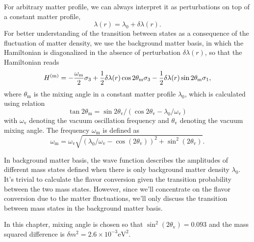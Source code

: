 For arbitrary matter profile, we can always interpret it as perturbations on top of a constant matter profile,
\begin{equation}
    \lambda(r) = \lambda_0 + \delta \lambda(r).
    \label{eq-general-matter-profile}
\end{equation}
For better understanding of the transition between states as a consequence of the fluctuation of matter density, we use the background matter basis, in which the Hamiltonian is diagonalized in the absence of perturbation $\delta\lambda(r)$, so that the Hamiltonian reads
\begin{equation}
    H^{(\mathrm{m})} = -\frac{\omega_\mm}{2} \sigma_3 + \frac{1}{2} \delta\lambda(r) \cos 2\theta_{\mathrm m} \sigma_3
     - \frac{1}{2} \delta\lambda(r) \sin 2\theta_{\mathrm m} \sigma_1,
    \label{eq-hamiltonian-bg-matter-basis-general}
\end{equation}
where $\theta_{\mathrm m}$ is the mixing angle in a constant matter profile $\lambda_0$, which is calculated using relation
\begin{equation*}
\tan 2\theta_{\mathrm{m}}=\sin 2\theta_{\mathrm v}/\left( \cos 2\theta_{\mathrm v} - \lambda_0/\omega_{\mathrm v} \right)
\end{equation*}
with $\omega_{\mathrm v}$ denoting the vacuum oscillation frequency and $\theta_{\mathrm v}$ denoting the vacuum mixing angle. The frequency $\omega_{\mathrm m}$ is defined as
\begin{equation}
\omega_{\mathrm{m}} = \omega_{\mathrm{v}} \sqrt{ ( \lambda_0/\omega_{\mathrm{v}} - \cos (2\theta_{\mathrm{v}}) )^2 + \sin^2(2\theta_{\mathrm{v}}) }.
\end{equation}

In background matter basis, the wave function describes the amplitudes of different mass states defined when there is only background matter density $\lambda_0$. It's trivial to calculate the flavor conversion given the transition probability between the two mass states. However, since we'll concentrate on the flavor conversion due to the matter fluctuations, we'll only discuss the transition between mass states in the background matter basis.

In this chapter, mixing angle is chosen so that $\sin^2(2\theta_{\mathrm v}) = 0.093$ and the mass squared difference is $\delta m^2 = 2.6\times 10^{-3}\mathrm{eV}^2$.







